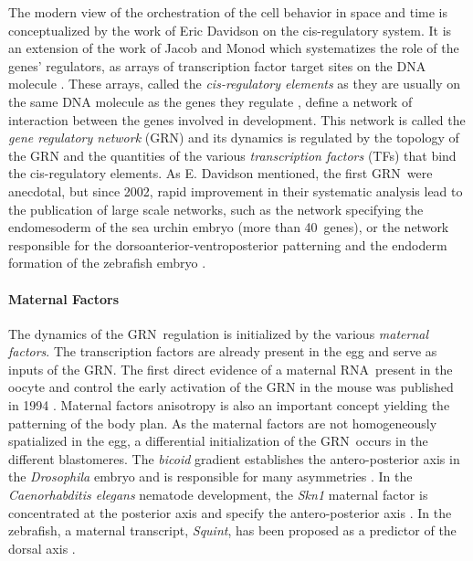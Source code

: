   The modern view of the orchestration of the cell behavior in space and time is conceptualized by the work of Eric Davidson on the cis-regulatory system. It is an extension of the work of Jacob and Monod which systematizes the role of the genes' regulators, as arrays of transcription factor target sites on the DNA molecule \cite{Arnone:1997th}. These arrays, called the \textit{cis-regulatory elements} as they are usually on the same DNA molecule as the genes they regulate \cite{Davidson:2006ud}, define a network of interaction between the genes involved in development. This network is called the \textit{gene regulatory network} (GRN) and its dynamics is regulated by the topology of the GRN and the quantities of the various \textit{transcription factors} (TFs) that bind the cis-regulatory elements. As E. Davidson mentioned, the first GRN were anecdotal, but since 2002, rapid improvement in their systematic analysis lead to the publication of large scale networks, such as the network specifying the endomesoderm of the sea urchin embryo (more than 40 genes), or the network responsible for the dorsoanterior-ventroposterior patterning and the endoderm formation of the zebrafish embryo \cite{Chan:2009er}. 

\paragraph{Maternal Factors}


  The dynamics of the GRN regulation is initialized by the various \textit{maternal factors}\cite{Pelegri:2003wm}. The transcription factors are already present in the egg and serve as inputs of the GRN. The first direct evidence of a maternal RNA present in the oocyte and control the early activation of the GRN in the mouse was published in 1994 \cite{Renard:1994wo}. Maternal factors anisotropy is also an important concept yielding the patterning of the body plan. As the maternal factors are not homogeneously spatialized in the egg, a differential initialization of the GRN occurs in the different blastomeres. The \textit{bicoid} gradient establishes the antero-posterior axis in the \textit{Drosophila} embryo and is responsible for many asymmetries \cite{Gavis:1992ug}\cite{StJohnston:1992uu}. In the \textit{Caenorhabditis elegans} nematode development, the \textit{Skn1} maternal factor is concentrated at the posterior axis and specify the antero-posterior axis \cite{Bowerman:1992tc}. In the zebrafish, a maternal transcript, \textit{Squint}, has been proposed as a predictor of the dorsal axis \cite{Gore:2005fj}. 

